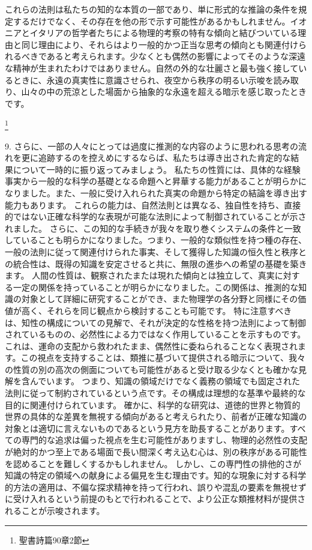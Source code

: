 \documentclass[a4paper,11pt,openany]{ltjsbook}
\begin{document}
これらの法則は私たちの知的な本質の一部であり、単に形式的な推論の条件を規定するだけでなく、その存在を他の形で示す可能性があるかもしれません。イオニアとイタリアの哲学者たちによる物理的考察の特有な傾向と結びついている理由と同じ理由により、それらはより一般的かつ正当な思考の傾向とも関連付けられるべきであると考えられます。少なくとも偶然の影響によってそのような深遠な精神が生まれたわけではありません。自然の外的な壮麗さと最も強く接しているときに、永遠の真実性に意識させられ、夜空から秩序の明るい示唆を読み取り、山々の中の荒涼とした場面から抽象的な永遠を超える暗示を感じ取ったときです。

\footnote{聖書詩篇90章2節}

9. さらに、一部の人々にとっては過度に推測的な内容のように思われる思考の流れを更に追跡するのを控えめにするならば、私たちは導き出された肯定的な結果について一時的に振り返ってみましょう。
私たちの性質には、具体的な経験事実から一般的な科学の基礎となる命題へと昇華する能力があることが明らかになりました。また、一般に受け入れられた真実の命題から特定の結論を導き出す能力もあります。
これらの能力は、自然法則とは異なる、独自性を持ち、直接的ではない正確な科学的な表現が可能な法則によって制御されていることが示されました。
さらに、この知的な手続きが我々を取り巻くシステムの条件と一致していることも明らかになりました。つまり、一般的な類似性を持つ種の存在、一般の法則に従って関連付けられた事実、そして獲得した知識の恒久性と秩序との統合性は、既得の知識を安定させると共に、無限の進歩への希望の基礎を築きます。
人間の性質は、観察されたまたは現れた傾向とは独立して、真実に対する一定の関係を持っていることが明らかになりました。この関係は、推測的な知識の対象として詳細に研究することができ、また物理学の各分野と同様にその価値が高く、それらを同じ観点から検討することも可能です。
特に注意すべきは、知性の構成についての見解で、それが決定的な性格を持つ法則によって制御されているものの、必然性による力ではなく作用していることを示すものです。これは、運命の支配から救われたまま、偶然性に委ねられることなく表現されます。この視点を支持することは、類推に基づいて提供される暗示について、我々の性質の別の高次の側面についても可能性があると受け取る少なくとも確かな見解を含んでいます。
つまり、知識の領域だけでなく義務の領域でも固定された法則に従って制約されているという点です。その構成は理想的な基準や最終的な目的に関連付けられています。
確かに、科学的な研究は、道徳的世界と物質的世界の具体的な差異を無視する傾向があると考えられたり、前者が正確な知識の対象とは適切に言えないものであるという見方を助長することがあります。すべての専門的な追求は偏った視点を生む可能性がありますし、物理的必然性の支配が絶対的かつ至上である場面で長い間深く考え込む心は、別の秩序がある可能性を認めることを難しくするかもしれません。
しかし、この専門性の排他的さが知識の特定の領域への献身による偏見を生む理由です。知的な現象に対する科学的方法の適用は、不偏な探求精神を持って行われ、誤りや混乱の要素を無視せずに受け入れるという前提のもとで行われることで、より公正な類推材料が提供されることが示唆されます。
\end{document}
